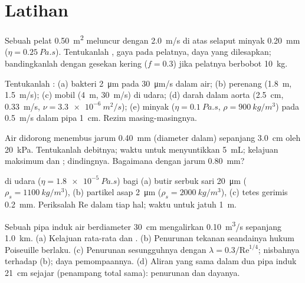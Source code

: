 \section{Latihan}

\begin{exercise}[$\star$]\label{exo:b2:viscous-flows:1}
Sebuah pelat \qty{0.50}{m^2} meluncur dengan \qty{2.0}{m/s} di atas selaput minyak \qty{0.20}{mm}
($\eta = \qty{0.25}{Pa.s}$). Tentukanlah , gaya pada pelatnya, daya
yang dilesapkan; bandingkanlah dengan gesekan kering ($f = 0.3$) jika pelatnya berbobot
\qty{10}{kg}.
\end{exercise}

\begin{exercise}[$\star$]\label{exo:b2:viscous-flows:2}
Tentukanlah : (a) bakteri \qty{2}{\micro m} pada \qty{30}{\micro m/s} dalam
air; (b) perenang (\qty{1.8}{m}, \qty{1.5}{m/s}); (c) mobil (\qty{4}{m},
\qty{30}{m/s}) di udara; (d) darah dalam aorta (\qty{2.5}{cm}, \qty{0.33}{m/s},
$\nu = \qty{3.3e-6}{m^2/s}$); (e) minyak ($\eta = \qty{0.1}{Pa.s}$, $\rho =
\qty{900}{kg/m^3}$) pada \qty{0.5}{m/s} dalam pipa \qty{1}{cm}. Rezim masing-masingnya.
\end{exercise}

\begin{exercise}[$\star$]\label{exo:b2:viscous-flows:3}
Air didorong menembus jarum \qty{0.40}{mm} (diameter dalam) sepanjang \qty{3.0}{cm}
oleh \qty{20}{kPa}. Tentukanlah debitnya; waktu untuk menyuntikkan \qty{5}{mL}; kelajuan maksimum
dan ;  dindingnya. Bagaimana dengan jarum \qty{0.80}{mm}?
\end{exercise}

\begin{exercise}[$\star$]\label{exo:b2:viscous-flows:4}
 di udara ($\eta = \qty{1.8e-5}{Pa.s}$) bagi (a) butir serbuk sari \qty{20}{\micro m}
($\rho_s = \qty{1100}{kg/m^3}$), (b) partikel asap \qty{2}{\micro m}
($\rho_s = \qty{2000}{kg/m^3}$), (c) tetes gerimis \qty{0.2}{mm}.
Periksalah $\mathrm{Re}$ dalam tiap hal; waktu untuk jatuh \qty{1}{m}.
\end{exercise}

\begin{exercise}[$\star\star$]\label{exo:b2:viscous-flows:5}
Sebuah pipa induk air berdiameter \qty{30}{cm} mengalirkan \qty{0.10}{m^3/s} sepanjang
\qty{1.0}{km}. (a) Kelajuan rata-rata dan . (b) Penurunan tekanan seandainya
hukum Poiseuille berlaku. (c) Penurunan sesungguhnya dengan $\lambda = 0.3/\mathrm{Re}^{1/4}$;
nisbahnya terhadap (b); daya pemompaannya. (d) Aliran yang sama dalam dua pipa induk
\qty{21}{cm} sejajar (penampang total sama): penurunan dan dayanya.
\end{exercise}

